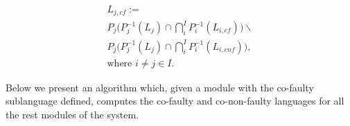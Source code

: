 \documentclass[a4paper, 10pt, conference]{ieeeconf}
\begin{document}
\begin{equation}
\label{}
	\begin{array}{l}
		L_{j,cf} := 
		\\
		P_j\Big(P_j^{-1}(L_j) \cap 
		\bigcap_i^I P_i^{-1}(L_{i,cf})\Big) \backslash 
		\\
		P_j\Big(P_j^{-1}(L_j) \cap 
		\bigcap_i^I P_i^{-1}(L_{i,cnf})\Big),
		\\ 
		\textrm{where } i\neq j\in I.
	\end{array}
\end{equation}


Below we present an algorithm which, given a module with the co-faulty
sublanguage defined, computes the co-faulty and co-non-faulty languages for all
the rest modules of the system.



% 
% 
% 

\end{document}
